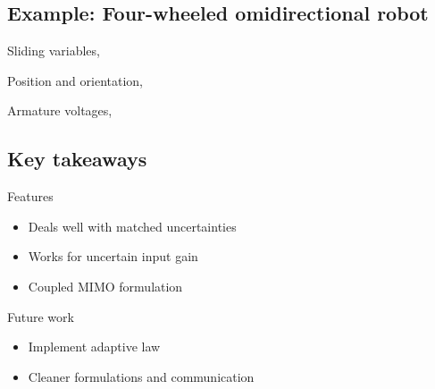 \subsection{Example: Four-wheeled omidirectional robot}
{Sliding variables, \cite{Mor:21}}

{Position and orientation, \cite{Mor:21}}


{Armature voltages, \cite{Mor:21}}

\subsection{Key takeaways}
{Features}
        \begin{itemize}
            \item Deals well with matched uncertainties
            \item Works for uncertain input gain
            \item Coupled MIMO formulation
        \end{itemize}
{Future work}
        \begin{itemize}
            \item Implement adaptive law
            \item Cleaner formulations and communication
        \end{itemize}

